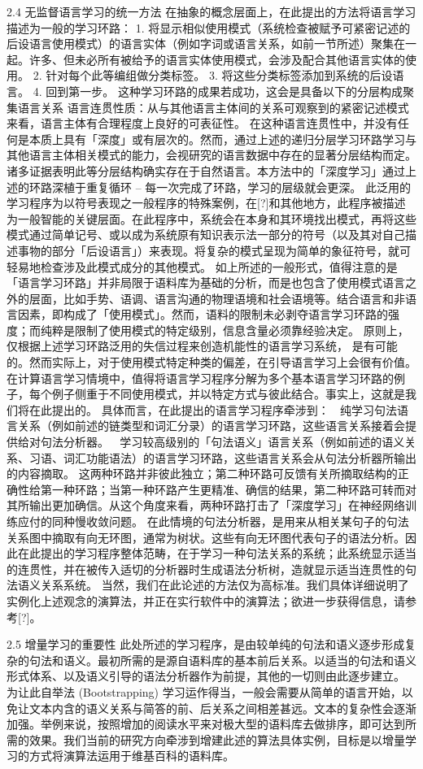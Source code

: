 2.4 无监督语言学习的统一方法
在抽象的概念层面上，在此提出的方法将语言学习描述为一般的学习环路：
1. 将显示相似使用模式（系统检查被赋予可紧密记述的后设语言使用模式）的语言实体（例如字词或语言关系，如前一节所述）聚集在一起。许多、但未必所有被给予的语言实体使用模式，会涉及配合其他语言实体的使用。 
2. 针对每个此等编组做分类标签。 
3. 将这些分类标签添加到系统的后设语言。
4. 回到第一步。
这种学习环路的成果若成功，这会是具备以下的分层构成聚集语言关系
语言连贯性质：从与其他语言主体间的关系可观察到的紧密记述模式来看，语言主体有合理程度上良好的可表征性。
在这种语言连贯性中，并没有任何是本质上具有「深度」或有层次的。然而，通过上述的递归分层学习环路学习与其他语言主体相关模式的能力，会视研究的语言数据中存在的显著分层结构而定。诸多证据表明此等分层结构确实存在于自然语言。本方法中的「深度学习」通过上述的环路深植于重复循环 – 每一次完成了环路，学习的层级就会更深。
此泛用的学习程序为以符号表现之一般程序的特殊案例，在[?]和其他地方，此程序被描述为一般智能的关键层面。在此程序中，系统会在本身和其环境找出模式，再将这些模式通过简单记号、或以成为系统原有知识表示法一部分的符号（以及其对自己描述事物的部分「后设语言」）来表现。将复杂的模式呈现为简单的象征符号，就可轻易地检查涉及此模式成分的其他模式。
如上所述的一般形式，值得注意的是「语言学习环路」并非局限于语料库为基础的分析，而是也包含了使用模式语言之外的层面，比如手势、语调、语言沟通的物理语境和社会语境等。结合语言和非语言因素，即构成了「使用模式」。然而，语料的限制未必剥夺语言学习环路的强度；而纯粹是限制了使用模式的特定级别，信息含量必须靠经验决定。
原则上，仅根据上述学习环路泛用的失信过程来创造机能性的语言学习系统， 是有可能的。然而实际上，对于使用模式特定种类的偏差，在引导语言学习上会很有价值。在计算语言学习情境中，值得将语言学习程序分解为多个基本语言学习环路的例子，每个例子侧重于不同使用模式，并以特定方式与彼此结合。事实上，这就是我们将在此提出的。
具体而言，在此提出的语言学习程序牵涉到：
	纯学习句法语言关系（例如前述的链类型和词汇分录）的语言学习环路，这些语言关系接着会提供给对句法分析器。 
	学习较高级别的「句法语义」语言关系（例如前述的语义关系、习语、词汇功能语法）的语言学习环路，这些语言关系会从句法分析器所输出的内容摘取。
这两种环路并非彼此独立；第二种环路可反馈有关所摘取结构的正确性给第一种环路；当第一种环路产生更精准、确信的结果，第二种环路可转而对其所输出更加确信。从这个角度来看，两种环路打击了「深度学习」在神经网络训练应付的同种慢收敛问题。
在此情境的句法分析器，是用来从相关某句子的句法关系图中摘取有向无环图，通常为树状。这些有向无环图代表句子的语法分析。因此在此提出的学习程序整体范畴，在于学习一种句法关系的系统；此系统显示适当的连贯性，并在被传入适切的分析器时生成语法分析树，造就显示适当连贯性的句法语义关系系统。
当然，我们在此论述的方法仅为高标准。我们具体详细说明了实例化上述观念的演算法，并正在实行软件中的演算法；欲进一步获得信息，请参考[?]。


2.5 增量学习的重要性
此处所述的学习程序，是由较单纯的句法和语义逐步形成复杂的句法和语义。最初所需的是源自语料库的基本前后关系。以适当的句法和语义形式体系、以及语义引导的语法分析器作为前提，其他的一切则由此逐步建立。
为让此自举法 (Bootstrapping) 学习运作得当，一般会需要从简单的语言开始，以免让文本内含的语义关系与简答的前、后关系之间相差甚远。文本的复杂性会逐渐加强。举例来说，按照增加的阅读水平来对极大型的语料库去做排序，即可达到所需的效果。我们当前的研究方向牵涉到增建此述的算法具体实例，目标是以增量学习的方式将演算法运用于维基百科的语料库。
